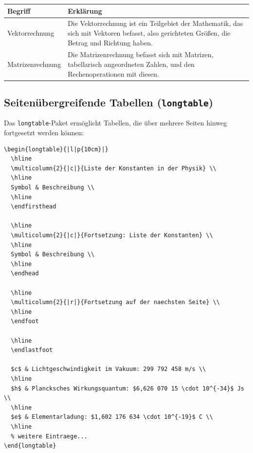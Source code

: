 \documentclass[12pt,a4paper]{article}
\begin{document}
\begin{ausgabe}
\begin{center}
\begin{tabularx}{\textwidth}{|l|X|}
  \hline
  Begriff & Erklärung \\
  \hline
  Vektorrechnung & Die Vektorrechnung ist ein Teilgebiet der Mathematik, das sich mit Vektoren befasst, also gerichteten Größen, die Betrag und Richtung haben. \\
  \hline
  Matrizenrechnung & Die Matrizenrechnung befasst sich mit Matrizen, tabellarisch angeordneten Zahlen, und den Rechenoperationen mit diesen. \\
  \hline
\end{tabularx}
\end{center}
\end{ausgabe}

\subsection{Seitenübergreifende Tabellen (\texttt{longtable})}

Das \texttt{longtable}-Paket ermöglicht Tabellen, die über mehrere Seiten hinweg fortgesetzt werden können:

\begin{lstlisting}[style=latex]
\begin{longtable}{|l|p{10cm}|}
  \hline
  \multicolumn{2}{|c|}{Liste der Konstanten in der Physik} \\
  \hline
  Symbol & Beschreibung \\
  \hline
  \endfirsthead
  
  \hline
  \multicolumn{2}{|c|}{Fortsetzung: Liste der Konstanten} \\
  \hline
  Symbol & Beschreibung \\
  \hline
  \endhead
  
  \hline
  \multicolumn{2}{|r|}{Fortsetzung auf der naechsten Seite} \\
  \hline
  \endfoot
  
  \hline
  \endlastfoot
  
  $c$ & Lichtgeschwindigkeit im Vakuum: 299 792 458 m/s \\
  \hline
  $h$ & Plancksches Wirkungsquantum: $6,626 070 15 \cdot 10^{-34}$ Js \\
  \hline
  $e$ & Elementarladung: $1,602 176 634 \cdot 10^{-19}$ C \\
  \hline
  % weitere Eintraege...
\end{longtable}
\end{lstlisting}
\end{document}
